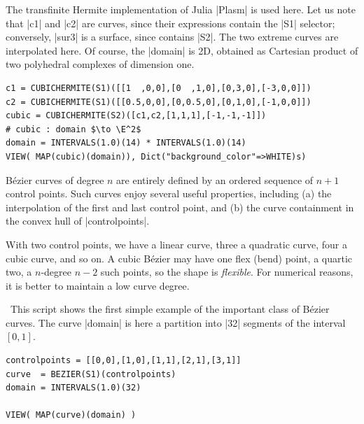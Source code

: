 \begin{coding}[Algebraic computation of FE = $\delta_1$]
{\begin{condition}
The transfinite Hermite implementation of Julia |Plasm| is used here.
Let us note that |c1| and |c2| are curves, since their expressions contain the |S1| selector; conversely, |sur3| is a surface, since contains |S2|. The two extreme curves are interpolated here. Of course, the |domain| is 2D, obtained as Cartesian product of two polyhedral complexes of dimension one.
\begin{lstlisting}[language=JuliaLocal, style=julia, mathescape=true]
c1 = CUBICHERMITE(S1)([[1  ,0,0],[0  ,1,0],[0,3,0],[-3,0,0]])
c2 = CUBICHERMITE(S1)([[0.5,0,0],[0,0.5,0],[0,1,0],[-1,0,0]])
cubic = CUBICHERMITE(S2)([c1,c2,[1,1,1],[-1,-1,-1]])		
# cubic : domain $\to \E^2$
domain = INTERVALS(1.0)(14) * INTERVALS(1.0)(14)
VIEW( MAP(cubic)(domain)), Dict("background_color"=>WHITE)s)
\end{lstlisting}
\end{condition}



\begin{definition}
Bézier curves of degree $n$ are entirely defined by an ordered sequence of $n+1$ control points. Such curves enjoy several useful properties, including (a) the interpolation of the first and last control point, and (b) the curve containment in the convex hull of |controlpoints|.  
\end{definition}
With two control points, we have a linear curve, three a quadratic curve, four a cubic curve, and so on. A cubic Bézier may have one flex (bend) point, a quartic two, a $n$-degree $n-2$ such points, so the shape is \emph{flexible}. For numerical reasons, it is better to maintain a low curve degree.

\begin{condition}\
This script shows the first simple example of the important class of Bézier curves.  The curve |domain| is here a partition into |32| segments of the interval $[0,1]$. 
\begin{lstlisting}[language=JuliaLocal, style=julia, mathescape=true]
controlpoints = [[0,0],[1,0],[1,1],[2,1],[3,1]]
curve  = BEZIER(S1)(controlpoints)
domain = INTERVALS(1.0)(32)

VIEW( MAP(curve)(domain) ) 
\end{lstlisting}
\end{condition}

}
\end{coding}
